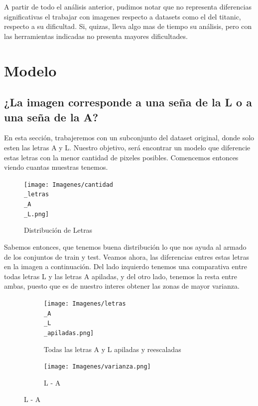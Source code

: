 \documentclass[10pt,a4paper]{article}
\begin{document}
A partir de todo el análisis anterior, pudimos notar que no representa diferencias significativas el trabajar con imagenes respecto a datasets como el del titanic, respecto a su dificultad. Si, quizas, lleva algo mas de tiempo su análisis, pero con las herramientas indicadas no presenta mayores dificultades.

\vspace{0.1cm}


\section{Modelo}

\subsection{¿La imagen corresponde a una seña de la L o a una seña de la A?} \vspace{0.1cm}

En esta sección, trabajeremos con un subconjunto del dataset original, donde solo esten las letras A  y L. Nuestro objetivo, será encontrar un modelo que
diferencie estas letras con la menor cantidad de pixeles posibles. Comencemos entonces viendo cuantas muestras tenemos. 

\begin{figure}[h]
  \texttt{[image: Imagenes/cantidad\\\_letras\\\_A\\\_L.png]}
  \caption{Distribución de Letras}
  \label{fig:Tabla 6}
\end{figure}

Sabemos entonces, que tenemos buena distribución lo que nos ayuda al armado de los conjuntos de train y test. Veamos ahora, las diferencias entres estas letras en la imagen a continuación.  Del lado izquierdo tenemos una comparativa entre todas letras L y las letras A apiladas, y del otro lado, tenemos la resta entre ambas, puesto que es de nuestro interes obtener las zonas de mayor varianza.

\newpage

\begin{figure}[ht!]
	\begin{subfigure}{0.5\textwidth}
		\centering
		\texttt{[image: Imagenes/letras\\\_A\\\_L\\\_apiladas.png]} 
		\caption{Todas las letras A y L apiladas y reescaladas}
		\label{fig:subfig1}
	\end{subfigure}
	\begin{subfigure}{0.55\textwidth}
		\texttt{[image: Imagenes/varianza.png]}
		\caption{L - A}
		\label{fig:subfig2}
	\end{subfigure}
	\label{fig:subfigs}
\end{figure}
\end{document}
